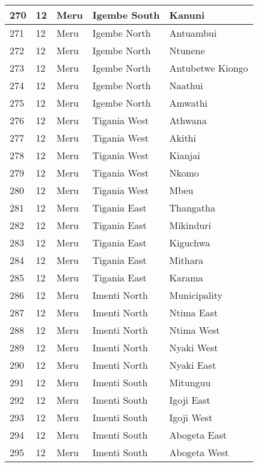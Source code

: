 \begin{table}[!ht]
\begin{tabular}{|l|l|l|l|l|}
        270 & 12 & Meru & Igembe South & Kanuni \\ \hline
        271 & 12 & Meru & Igembe North & Antuambui \\ \hline
        272 & 12 & Meru & Igembe North & Ntunene \\ \hline
        273 & 12 & Meru & Igembe North & Antubetwe Kiongo \\ \hline
        274 & 12 & Meru & Igembe North & Naathui \\ \hline
        275 & 12 & Meru & Igembe North & Amwathi \\ \hline
        276 & 12 & Meru & Tigania West & Athwana \\ \hline
        277 & 12 & Meru & Tigania West & Akithi \\ \hline
        278 & 12 & Meru & Tigania West & Kianjai \\ \hline
        279 & 12 & Meru & Tigania West & Nkomo \\ \hline
        280 & 12 & Meru & Tigania West & Mbeu \\ \hline
        281 & 12 & Meru & Tigania East & Thangatha \\ \hline
        282 & 12 & Meru & Tigania East & Mikinduri \\ \hline
        283 & 12 & Meru & Tigania East & Kiguchwa \\ \hline
        284 & 12 & Meru & Tigania East & Mithara \\ \hline
        285 & 12 & Meru & Tigania East & Karama \\ \hline
        286 & 12 & Meru & Imenti North & Municipality \\ \hline
        287 & 12 & Meru & Imenti North & Ntima East \\ \hline
        288 & 12 & Meru & Imenti North & Ntima West \\ \hline
        289 & 12 & Meru & Imenti North & Nyaki West \\ \hline
        290 & 12 & Meru & Imenti North & Nyaki East \\ \hline
        291 & 12 & Meru & Imenti South & Mitunguu \\ \hline
        292 & 12 & Meru & Imenti South & Igoji East \\ \hline
        293 & 12 & Meru & Imenti South & Igoji West \\ \hline
        294 & 12 & Meru & Imenti South & Abogeta East \\ \hline
        295 & 12 & Meru & Imenti South & Abogeta West \\ \hline

\end{tabular}
\end{table}
